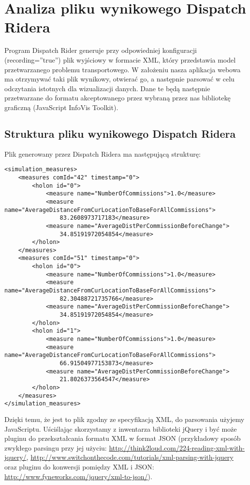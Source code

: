 \chapter{Analiza pliku wynikowego Dispatch Ridera}
Program Dispatch Rider generuje przy odpowiedniej konfiguracji (recording=''true'') plik wyjściowy w formacie XML, który przedstawia model przetwarzanego problemu transportowego. W założeniu nasza aplikacja webowa ma otrzymywać taki plik wynikowy, otwierać go, a następnie parsować w celu odczytania istotnych dla wizualizacji danych. Dane te będą następnie przetwarzane do formatu akceptowanego przez wybraną przez nas bibliotekę graficzną (JavaScript InfoVis Toolkit).

\section{Struktura pliku wynikowego Dispatch Ridera}
Plik generowany przez Dispatch Ridera ma następującą strukturę:
\begin{verbatim}
<simulation_measures>
    <measures comId="42" timestamp="0">
        <holon id="0">
            <measure name="NumberOfCommissions">1.0</measure>
            <measure name="AverageDistanceFromCurLocationToBaseForAllCommissions">
            	83.2608973717183</measure>
            <measure name="AverageDistPerCommissionBeforeChange">
           		34.85191972054854</measure>
        </holon>
    </measures>
    <measures comId="51" timestamp="0">
        <holon id="0">
            <measure name="NumberOfCommissions">1.0</measure>
            <measure name="AverageDistanceFromCurLocationToBaseForAllCommissions">
            	82.30488721735766</measure>
            <measure name="AverageDistPerCommissionBeforeChange">
            	34.85191972054854</measure>
        </holon>
        <holon id="1">
            <measure name="NumberOfCommissions">1.0</measure>
            <measure name="AverageDistanceFromCurLocationToBaseForAllCommissions">
            	66.91504977153873</measure>
            <measure name="AverageDistPerCommissionBeforeChange">
            	21.8026373564547</measure>
        </holon>
    </measures>
</simulation_measures>
\end{verbatim}
Dzięki temu, że jest to plik zgodny ze specyfikacją XML, do parsowania użyjemy JavaScriptu. Uściślając skorzystamy z inwentarza biblioteki jQuery i być może pluginu do przekształcania formatu XML w format JSON (przykładowy sposób zwykłego parsingu przy jej użyciu: \url{http://think2loud.com/224-reading-xml-with-jquery/}, \url{http://www.switchonthecode.com/tutorials/xml-parsing-with-jquery} oraz pluginu do konwersji pomiędzy XML i JSON: \url{http://www.fyneworks.com/jquery/xml-to-json/}).
